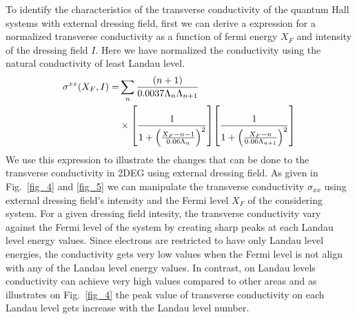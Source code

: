 To identify the characteristics of the transverse conductivity of the quantum Hall systems with external dressing field, first we can derive a expression for a normalized
transverse conductivity as a function of fermi energy $X_F$ and intensity of the dressing field $I$. Here we have normalized the conductivity using the natural conductivity of least Landau level.
\begin{equation} \label{eq_36}
  \begin{aligned}
    \sigma^{xx}(X_F,I) = &
    \sum_{n}
    \frac{\qty(n+1)}{0.0037\Lambda_n \Lambda_{n+1}} \\
    & \times
    \qty[
      \frac{1}
      {
        1 + \qty(\frac{X_F - n -1}{0.06\Lambda_n})^2
      }
    ]
    \qty[
      \frac{1}
      {
        1 + \qty(\frac{X_F - n}{0.06\Lambda_{n+1}})^2
      }
    ]
  \end{aligned}
\end{equation}
We use this expression to illustrate the changes that can be done to the transverse conductivity in 2DEG using external dressing field. As given in Fig.~\ref{fig_4} and \ref{fig_5} we can manipulate the transverse conductivity $\sigma_{xx}$ using external dressing field's intensity and the Fermi level $X_F$ of the considering system. For a given dressing field intesity, the transverse conductivity vary against the Fermi level of the system by creating sharp peaks at each Landau level energy values. Since electrons are restricted to have only Landau level energies, the conductivity gets very low values when the Fermi level is not align with any of the Landau level energy values. In contrast, on Landau levels conductivity can achieve very high values compared to other areas and as illustrates on Fig.~\ref{fig_4} the peak value of transverse conductivity on each Landau level gets increase with the Landau level number.

